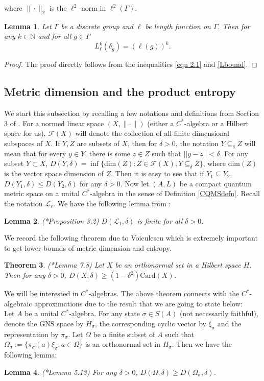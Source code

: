 \documentclass[a4paper,11pt,reqno]{amsart}
\theoremstyle{plain}
\newtheorem{thm}{Theorem}[section]
\newtheorem{lem}[thm]{Lemma}
\theoremstyle{mainthmstyle}
\theoremstyle{named}
\numberwithin{equation}{section}
\begin{document}
where $\| \cdot \|_{2}$ is the $\ell^{2}$-norm in $\ell^{2}(\Gamma)$.
\begin{lem}\label{deltag}
Let $\Gamma$ be a discrete group and $\ell$ be length function on $\Gamma.$ Then for any $k \in \mathbb N$ and for all $g \in \Gamma$ $$L_{\ell}^{k} \left (\delta_{g} \right ) = \left (\ell (g) \right )^{k}.$$
\end{lem}
\begin{proof}
The proof directly follows from the inequalities \eqref {eqn 2.1} and \eqref {Lbound}.
\end{proof}
\subsection{Metric dimension and the product entropy} We start this subsection by recalling a few notations and definitions from Section 3 of \cite{Kerr}. For a normed linear space $(X,\| \cdot \|)$ (either a $C^{\ast}$-algebra or a Hilbert space for us), $\mathcal{F}(X)$ will denote the collection of all finite dimensional subspaces of $X$. If $Y,Z$ are subsets of $X$, then for $\delta>0$, the notation $Y\subseteq_{\delta} Z$ will mean that for every $y\in Y$, there is some $z\in Z$ such that $\lvert\lvert y-z\rvert\rvert<\delta$. For any subset $Y\subset X$, $D(Y,\delta)=\inf\{{\textrm{dim}}(Z):Z\in\mathcal{F}(X), Y\subseteq_{\delta}Z\}$, where $\textrm{dim}(Z)$ is the vector space dimension of $Z$. Then it is easy to see that if $Y_{1}\subseteq Y_{2}$, $D(Y_{1},\delta)\leq D(Y_{2},\delta)$ for any $\delta>0$. Now let $(A,L)$ be a compact quantum metric space on a unital $C^{\ast}$-algebra in the sense of Definition \ref{CQMSdefn}. Recall the notation $\mathcal{L}_{r}$. We have the following lemma from \cite{Kerr} :
\begin{lem} (\cite{Kerr}*{Proposition 3.2})
    $D(\mathcal{L}_{1},\delta)$ is finite for all $\delta>0$.
\end{lem}
We record the following theorem due to Voiculescu which is extremely important to get lower bounds of metric dimension and entropy.
\begin{thm}\label{Voiculescu}(\cite{Voiculescu}*{Lemma 7.8}) Let $X$ be an orthonormal set in a Hilbert space $H$. Then for any $\delta>0$, $D(X,\delta)\geq(1-\delta^{2}){\mathrm {Card}}(X)$. 
\end{thm}
We will be interested in $C^{\ast}$-algebras. The above theorem connects with the $C^{\ast}$-algebraic approximations due to the result that we are going to state below:\\
Let $A$ be a unital $C^{\ast}$-algebra. For any state $\sigma\in S(A)$ (not necessarily faithful), denote the GNS space by $H_{\sigma}$, the corresponding cyclic vector by $\xi_{\sigma}$ and the representation by $\pi_{\sigma}$. Let $\Omega$ be a finite subset of $A$ such that $\Omega_{\sigma}:=\{\pi_{\sigma}(a)\xi_{\sigma}:a\in\Omega\}$ is an orthonormal set in $H_{\sigma}$. Then we have the following lemma:
\begin{lem}\label{VoiculescuCalg} (\cite{Kerr}*{Lemma 5.13})
 For any $\delta>0$, $D(\Omega,\delta)\geq D(\Omega_{\sigma},\delta)$.  
\end{lem}
\end{document}
